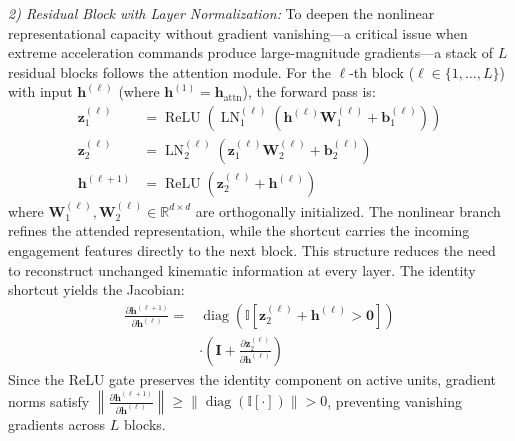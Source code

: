 \documentclass[lettersize,journal]{IEEEtran}
\newcommand{\hladd}[1]{{\color{blue}#1}}
\begin{document}
\emph{2) Residual Block with Layer Normalization:} To deepen the nonlinear representational capacity without gradient vanishing---a critical issue when \hladd{extreme acceleration commands} produce large-magnitude gradients---a stack of $L$ residual blocks follows the attention module. For the $\ell$-th block ($\ell \in \{1, \dots, L\}$) with input $\mathbf{h}^{(\ell)}$ (where $\mathbf{h}^{(1)} = \mathbf{h}_{\mathrm{attn}}$), the forward pass is:
\begin{align}
\mathbf{z}_1^{(\ell)} &= \operatorname{ReLU} \left( \operatorname{LN}_1^{(\ell)} \left( \mathbf{h}^{(\ell)}\mathbf{W}_1^{(\ell)} + \mathbf{b}_1^{(\ell)} \right) \right) \label{eq:res_block_inner1} \\
\mathbf{z}_2^{(\ell)} &= \operatorname{LN}_2^{(\ell)} \left( \mathbf{z}_1^{(\ell)}\mathbf{W}_2^{(\ell)} + \mathbf{b}_2^{(\ell)} \right) \label{eq:res_block_inner2} \\
\mathbf{h}^{(\ell+1)} &= \operatorname{ReLU} \left( \mathbf{z}_2^{(\ell)} + \mathbf{h}^{(\ell)} \right) \label{eq:res_block_out}
\end{align}
where $\mathbf{W}_1^{(\ell)}, \mathbf{W}_2^{(\ell)} \in \mathbb{R}^{d \times d}$ are orthogonally initialized. 
\hladd{The nonlinear branch refines the attended representation, while
the shortcut carries the incoming engagement features directly to the next
block. This structure reduces the need to reconstruct unchanged kinematic
information at every layer.}
The identity shortcut yields the Jacobian:
\begin{equation}
\label{eq:jacobian}
\begin{split}
\frac{\partial \mathbf{h}^{(\ell+1)}}{\partial \mathbf{h}^{(\ell)}} =& \operatorname{diag}\!\left(\mathbb{I}\!\left[\mathbf{z}_2^{(\ell)} + \mathbf{h}^{(\ell)} > \mathbf{0}\right]\right) \\
&\cdot \left(\mathbf{I} + \frac{\partial \mathbf{z}_2^{(\ell)}}{\partial \mathbf{h}^{(\ell)}}\right)
\end{split}
\end{equation}
Since the ReLU gate preserves the identity component on active units, gradient norms satisfy $\left\|\frac{\partial \mathbf{h}^{(\ell+1)}}{\partial \mathbf{h}^{(\ell)}}\right\| \geq \left\|\operatorname{diag}(\mathbb{I}[\cdot])\right\| > 0$, preventing vanishing gradients across $L$ blocks.
\end{document}
